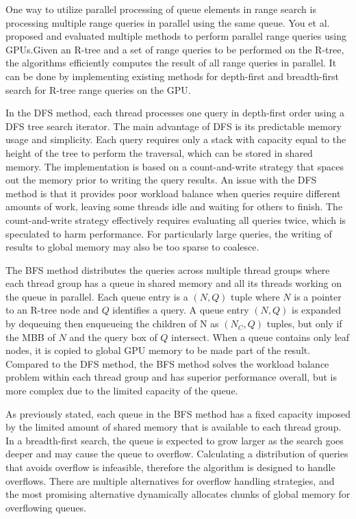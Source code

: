 One way to utilize parallel processing of queue elements in range search is processing multiple range queries in parallel using the same queue. You et al.~\cite{you2013parallel} proposed and evaluated multiple methods to perform parallel range queries using GPUs.\@ Given an R-tree and a set of range queries to be performed on the R-tree, the algorithms efficiently computes the result of all range queries in parallel. It can be done by implementing existing methods for depth-first and breadth-first search for R-tree range queries on the GPU.\@

In the DFS method, each thread processes one query in depth-first order using a DFS tree search iterator. The main advantage of DFS is its predictable memory usage and simplicity. Each query requires only a stack with capacity equal to the height of the tree to perform the traversal, which can be stored in shared memory. The implementation is based on a count-and-write strategy that spaces out the memory prior to writing the query results. An issue with the DFS method is that it provides poor workload balance when queries require different amounts of work, leaving some threads idle and waiting for others to finish. The count-and-write strategy effectively requires evaluating all queries twice, which is speculated to harm performance. For particularly large queries, the writing of results to global memory may also be too sparse to coalesce.

The BFS method distributes the queries across multiple thread groups where each thread group has a queue in shared memory and all its threads working on the queue in parallel. Each queue entry is a \((N, Q)\) tuple where \(N\) is a pointer to an R-tree node and \(Q\) identifies a query. A queue entry \((N, Q)\) is expanded by dequeuing then enqueueing the children of N as \((N_C, Q)\) tuples, but only if the MBB of \(N\) and the query box of \(Q\) intersect. When a queue contains only leaf nodes, it is copied to global GPU memory to be made part of the result. Compared to the DFS method, the BFS method solves the workload balance problem within each thread group and has superior performance overall, but is more complex due to the limited capacity of the queue.

As previously stated, each queue in the BFS method has a fixed capacity imposed by the limited amount of shared memory that is available to each thread group. In a breadth-first search, the queue is expected to grow larger as the search goes deeper and may cause the queue to overflow. Calculating a distribution of queries that avoids overflow is infeasible, therefore the algorithm is designed to handle overflows. There are multiple alternatives for overflow handling strategies, and the most promising alternative dynamically allocates chunks of global memory for overflowing queues.

